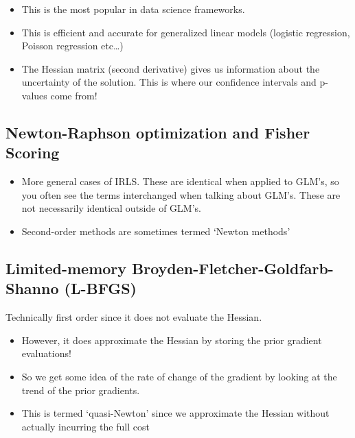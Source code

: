 \documentclass[fontset=fandol,zihao=false,scheme=chinese,heading=true,UTF8]{ctexbook}
\providecommand{\tightlist}{%
  \setlength{\itemsep}{0pt}\setlength{\parskip}{0pt}}
\begin{document}
\begin{itemize}
\tightlist
\item
  This is the most popular in data science frameworks.
\item
  This is efficient and accurate for generalized linear models (logistic regression, Poisson regression etc\ldots{})
\item
  The Hessian matrix (second derivative) gives us information about the uncertainty of the solution. This is where our confidence intervals and p-values come from!
\end{itemize}

\hypertarget{newton-raphson-optimization-and-fisher-scoring}{%
\subsection{Newton-Raphson optimization and Fisher Scoring}\label{newton-raphson-optimization-and-fisher-scoring}}

\begin{itemize}
\tightlist
\item
  More general cases of IRLS. These are identical when applied to GLM's, so you often see the terms interchanged when talking about GLM's. These are not necessarily identical outside of GLM's.
\item
  Second-order methods are sometimes termed `Newton methods'
\end{itemize}

\hypertarget{limited-memory-broyden-fletcher-goldfarb-shanno-l-bfgs}{%
\subsection{Limited-memory Broyden-Fletcher-Goldfarb-Shanno (L-BFGS)}\label{limited-memory-broyden-fletcher-goldfarb-shanno-l-bfgs}}

Technically first order since it does not evaluate the Hessian.

\begin{itemize}
\tightlist
\item
  However, it does approximate the Hessian by storing the prior gradient evaluations!
\item
  So we get some idea of the rate of change of the gradient by looking at the trend of the prior gradients.
\item
  This is termed `quasi-Newton' since we approximate the Hessian without actually incurring the full cost
\end{itemize}
\end{document}
